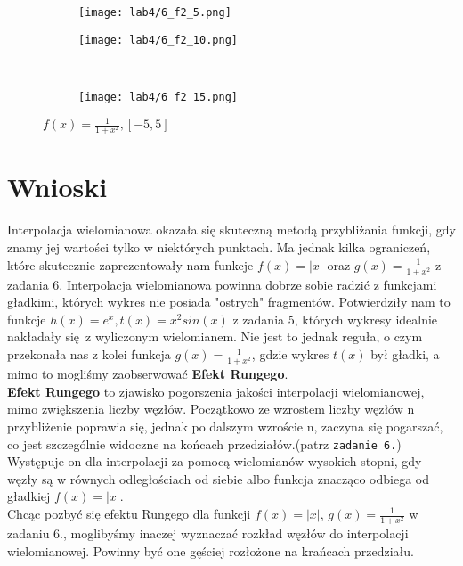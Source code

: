 \documentclass[a4paper]{article}
\begin{document}
    \begin{figure}[H]
     \centering
     \begin{subfigure}[b]{0.5\textwidth}
         \centering
         \texttt{[image: lab4/6\_f2\_5.png]}
     \end{subfigure}
     \hfill
     \begin{subfigure}[b]{0.5\textwidth}
         \centering
         \texttt{[image: lab4/6\_f2\_10.png]}
     \end{subfigure}
     \hfill
     \\
     \begin{subfigure}[b]{0.5\textwidth}
         \centering
         \texttt{[image: lab4/6\_f2\_15.png]}
     \end{subfigure}
        \caption{$f(x) = \frac{1}{1+x^2} , [-5, 5]$}
    \end{figure}


\section{Wnioski}
    Interpolacja wielomianowa okazała się skuteczną metodą przybliżania funkcji, gdy znamy jej wartości tylko w niektórych punktach. Ma jednak kilka ograniczeń, które skutecznie zaprezentowały nam funkcje $f(x) = |x|$ oraz $g(x) = \frac{1}{1+x^2}$ z zadania 6.
    Interpolacja wielomianowa powinna dobrze sobie radzić z funkcjami gładkimi, których wykres nie posiada "ostrych" fragmentów. Potwierdziły nam to funkcje $h(x) = e^x, t(x) = x^2sin(x)$ z zadania 5, których wykresy idealnie nakładały się z wyliczonym wielomianem. Nie jest to jednak reguła, o czym przekonała nas z kolei funkcja $g(x) = \frac{1}{1+x^2}$, gdzie wykres $t(x)$ był gładki, a mimo to mogliśmy zaobserwować \textbf{Efekt Rungego}. \\
    \textbf{Efekt Rungego} to zjawisko pogorszenia jakości interpolacji wielomianowej, mimo zwiększenia liczby węzłów. Początkowo ze wzrostem liczby węzłów n przybliżenie poprawia się, jednak po dalszym wzroście n, zaczyna się pogarszać, co jest szczególnie widoczne na końcach przedziałów.(patrz \texttt{zadanie 6.})\\
    Występuje on dla interpolacji za pomocą wielomianów wysokich stopni, gdy węzły są w równych odległościach od siebie albo funkcja znacząco odbiega od gładkiej $f(x) = |x|$. \\
    Chcąc pozbyć się efektu Rungego dla funkcji $f(x) = |x|$, $g(x) = \frac{1}{1+x^2}$ w zadaniu 6., moglibyśmy inaczej wyznaczać rozkład węzłów do interpolacji wielomianowej. Powinny być one gęściej rozłożone na krańcach przedziału.

    
\end{document}
